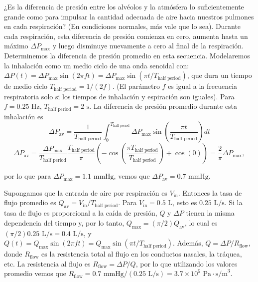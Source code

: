 \documentclass[12pt]{book}
\begin{document}
¿Es la diferencia de presión entre los alvéolos y la atmósfera lo suficientemente grande como para impulsar la cantidad adecuada de aire hacia nuestros pulmones en cada respiración? (En condiciones normales, más vale que lo sea). Durante cada respiración, esta diferencia de presión comienza en cero, aumenta hasta un máximo $\Delta P_{\text{max}}$ y luego disminuye nuevamente a cero al final de la respiración. Determinemos la diferencia de presión promedio en esta secuencia. Modelaremos la inhalación como un medio ciclo de una onda senoidal con: $\Delta P(t) = \Delta P_{\text{max}} \sin(2\pi f t) = \Delta P_{\text{max}} \sin(\pi t / T_{\text{half period}})$, que dura un tiempo de medio ciclo $T_{\text{half period}} = 1/(2f)$. (El parámetro $f$ es igual a la frecuencia respiratoria solo si los tiempos de inhalación y espiración son iguales). Para $f = 0.25\text{ Hz}$, $T_{\text{half period}} = 2\text{ s}$. La diferencia de presión promedio durante esta inhalación es
\begin{equation}
\Delta P_{\text{av}} = \frac{1}{T_{\text{half period}}} \int_{0}^{T_{\text{half period}}} \Delta P_{\text{max}} \sin\left(\frac{\pi t}{T_{\text{half period}}}\right) dt \label{eq:9.11}
\end{equation}
\begin{equation}
\Delta P_{\text{av}} = \frac{\Delta P_{\text{max}}}{T_{\text{half period}}} \frac{T_{\text{half period}}}{\pi} \left( -\cos\left(\frac{\pi T_{\text{half period}}}{T_{\text{half period}}}\right) + \cos(0) \right) = \frac{2}{\pi} \Delta P_{\text{max}}, \label{eq:9.12}
\end{equation}

por lo que para $\Delta P_{\text{max}} = 1.1\text{ mmHg}$, vemos que $\Delta P_{\text{av}} = 0.7\text{ mmHg}$.

Supongamos que la entrada de aire por respiración es $V_{\text{in}}$. Entonces la tasa de flujo promedio es $Q_{\text{av}} = V_{\text{in}} / T_{\text{half period}}$. Para $V_{\text{in}} = 0.5\text{ L}$, esto es $0.25\text{ L/s}$. Si la tasa de flujo es proporcional a la caída de presión, $Q$ y $\Delta P$ tienen la misma dependencia del tiempo y, por lo tanto, $Q_{\text{max}} = (\pi/2)Q_{\text{av}}$, lo cual es $(\pi/2)0.25\text{ L/s} = 0.4\text{ L/s}$, y $Q(t) = Q_{\text{max}} \sin(2\pi f t) = Q_{\text{max}} \sin(\pi t / T_{\text{half period}})$. Además, $Q = \Delta P / R_{\text{flow}}$, donde $R_{\text{flow}}$ es la resistencia total al flujo en los conductos nasales, la tráquea, etc. La resistencia al flujo es $R_{\text{flow}} = \Delta P / Q$, por lo que utilizando los valores promedio vemos que $R_{\text{flow}} = 0.7\text{ mmHg}/(0.25\text{ L/s}) = 3.7 \times 10^5\text{ Pa}\cdot\text{s/m}^3$.
\end{document}
